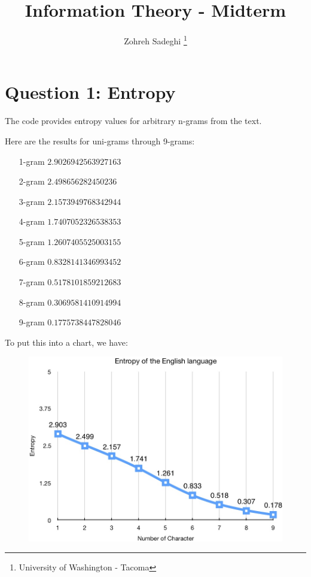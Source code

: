 \documentclass{article}
\title{Information Theory - Midterm}
\author{Zohreh Sadeghi \thanks{University of Washington - Tacoma}}
\begin{document}
\maketitle

\clearpage

\tableofcontents

\clearpage

\section{Question 1: Entropy}

The code provides entropy values for arbitrary n-grams from the text.

Here are the results for uni-grams through 9-grams:

\begin{itemize}
  \item[1-gram] $2.9026942563927163$
  \item[2-gram] $2.498656282450236$
  \item[3-gram] $2.1573949768342944$
  \item[4-gram] $1.7407052326538353$
  \item[5-gram] $1.2607405525003155$
  \item[6-gram] $0.8328141346993452$
  \item[7-gram] $0.5178101859212683$
  \item[8-gram] $0.3069581410914994$
  \item[9-gram] $0.1775738447828046$
\end{itemize}

To put this into a chart, we have:


\begin{figure}[h]
  \includegraphics[width=\textwidth]{images/entropy.jpg}
\end{figure}
\end{document}
